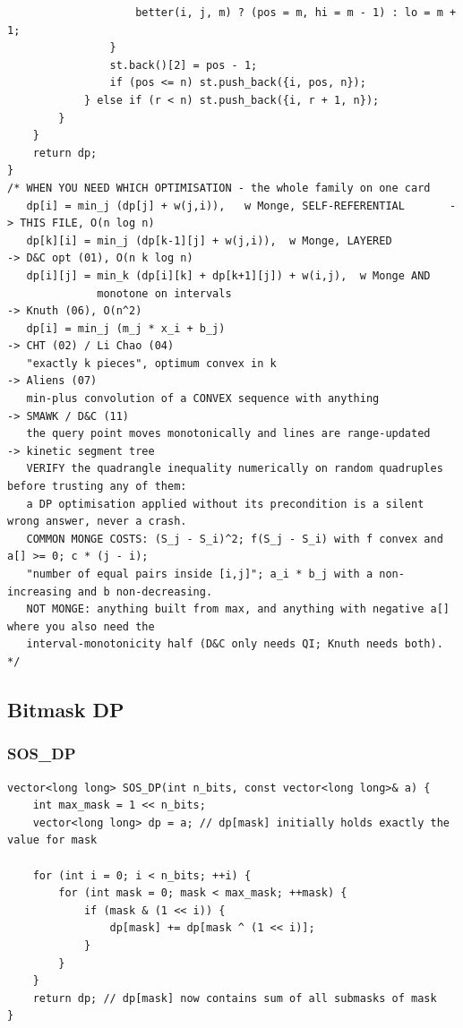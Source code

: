 \documentclass[9pt,a4paper,twocolumn]{extarticle}
\begin{document}
\begin{lstlisting}
                    better(i, j, m) ? (pos = m, hi = m - 1) : lo = m + 1;
                }
                st.back()[2] = pos - 1;
                if (pos <= n) st.push_back({i, pos, n});
            } else if (r < n) st.push_back({i, r + 1, n});
        }
    }
    return dp;
}
/* WHEN YOU NEED WHICH OPTIMISATION - the whole family on one card
   dp[i] = min_j (dp[j] + w(j,i)),   w Monge, SELF-REFERENTIAL       -> THIS FILE, O(n log n)
   dp[k][i] = min_j (dp[k-1][j] + w(j,i)),  w Monge, LAYERED          -> D&C opt (01), O(n k log n)
   dp[i][j] = min_k (dp[i][k] + dp[k+1][j]) + w(i,j),  w Monge AND
              monotone on intervals                                   -> Knuth (06), O(n^2)
   dp[i] = min_j (m_j * x_i + b_j)                                    -> CHT (02) / Li Chao (04)
   "exactly k pieces", optimum convex in k                            -> Aliens (07)
   min-plus convolution of a CONVEX sequence with anything            -> SMAWK / D&C (11)
   the query point moves monotonically and lines are range-updated    -> kinetic segment tree
   VERIFY the quadrangle inequality numerically on random quadruples before trusting any of them:
   a DP optimisation applied without its precondition is a silent wrong answer, never a crash.
   COMMON MONGE COSTS: (S_j - S_i)^2; f(S_j - S_i) with f convex and a[] >= 0; c * (j - i);
   "number of equal pairs inside [i,j]"; a_i * b_j with a non-increasing and b non-decreasing.
   NOT MONGE: anything built from max, and anything with negative a[] where you also need the
   interval-monotonicity half (D&C only needs QI; Knuth needs both). */
\end{lstlisting}

\subsection{Bitmask DP}

\filbreak
\subsubsection{SOS\_DP}
\nopagebreak
\begin{lstlisting}
vector<long long> SOS_DP(int n_bits, const vector<long long>& a) {
    int max_mask = 1 << n_bits;
    vector<long long> dp = a; // dp[mask] initially holds exactly the value for mask
    
    for (int i = 0; i < n_bits; ++i) {
        for (int mask = 0; mask < max_mask; ++mask) {
            if (mask & (1 << i)) {
                dp[mask] += dp[mask ^ (1 << i)];
            }
        }
    }
    return dp; // dp[mask] now contains sum of all submasks of mask
}
\end{lstlisting}
\end{document}
